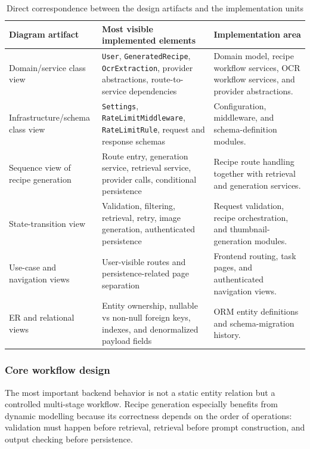 \begin{table}[H]
	\centering
	\scriptsize
	\renewcommand{\arraystretch}{1.2}
	\begin{tabularx}{\textwidth}{|p{2.8cm}|p{4.8cm}|X|}
		\hline
		\textbf{Diagram artifact} & \textbf{Most visible implemented elements} & \textbf{Implementation area} \\
		\hline
		Domain/service class view & \texttt{User}, \texttt{GeneratedRecipe}, \texttt{OcrExtraction}, provider abstractions, route-to-service dependencies & Domain model, recipe workflow services, OCR workflow services, and provider abstractions. \\
		\hline
		Infrastructure/schema class view & \texttt{Settings}, \texttt{RateLimitMiddleware}, \texttt{RateLimitRule}, request and response schemas & Configuration, middleware, and schema-definition modules. \\
		\hline
		Sequence view of recipe generation & Route entry, generation service, retrieval service, provider calls, conditional persistence & Recipe route handling together with retrieval and generation services. \\
		\hline
		State-transition view & Validation, filtering, retrieval, retry, image generation, authenticated persistence & Request validation, recipe orchestration, and thumbnail-generation modules. \\
		\hline
		Use-case and navigation views & User-visible routes and persistence-related page separation & Frontend routing, task pages, and authenticated navigation views. \\
		\hline
		ER and relational views & Entity ownership, nullable vs non-null foreign keys, indexes, and denormalized payload fields & ORM entity definitions and schema-migration history. \\
		\hline
	\end{tabularx}
	\caption{Direct correspondence between the design artifacts and the implementation units}
	\label{tab:diagram-code-map}
\end{table}

\subsubsection{Core workflow design}

The most important backend behavior is not a static entity relation but
a controlled multi-stage workflow. Recipe generation especially benefits
from dynamic modelling because its correctness depends on the order of
operations: validation must happen before retrieval, retrieval before
prompt construction, and output checking before persistence.

